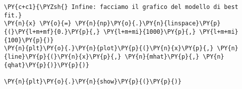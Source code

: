 \begin{Verbatim}[label=\makebox{\href{https://github.com/unipi-physics-labs/lab1-sheets/tree/main/snippy/dad_densita.py}{https://github.com/.../dad\_densita.py}},commandchars=\\\{\}]
\PY{c+c1}{\PYZsh{} Infine: facciamo il grafico del modello di best fit.}
\PY{n}{x} \PY{o}{=} \PY{n}{np}\PY{o}{.}\PY{n}{linspace}\PY{p}{(}\PY{l+m+mf}{0.}\PY{p}{,} \PY{l+m+mi}{1000}\PY{p}{,} \PY{l+m+mi}{100}\PY{p}{)}
\PY{n}{plt}\PY{o}{.}\PY{n}{plot}\PY{p}{(}\PY{n}{x}\PY{p}{,} \PY{n}{line}\PY{p}{(}\PY{n}{x}\PY{p}{,} \PY{n}{mhat}\PY{p}{,} \PY{n}{qhat}\PY{p}{)}\PY{p}{)}

\PY{n}{plt}\PY{o}{.}\PY{n}{show}\PY{p}{(}\PY{p}{)}
\end{Verbatim}
